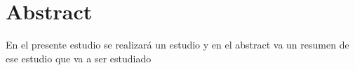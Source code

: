 \documentclass[12pt,a4paper]{article}
\begin{document}
\section*{\centering Abstract}
En el presente estudio se realizará un estudio y en el abstract va un resumen de ese estudio que va a ser estudiado

\end{document}
